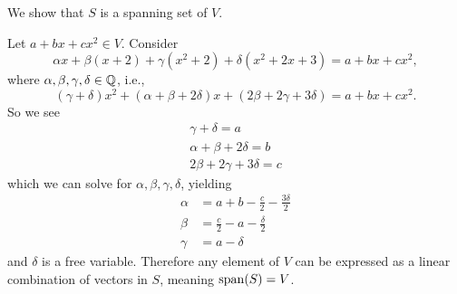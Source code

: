 \begin{questions}
    \item We show that $S$ is a spanning set of $V$.
    
    Let $a + bx + cx^2 \in V$. Consider
    \[
        \alpha x + \beta(x + 2) + \gamma(x^2 + 2) + \delta(x^2 + 2x + 3) = a + bx + cx^2,
    \]
    where $\alpha, \beta, \gamma, \delta \in \mathbb{Q}$, i.e.,
    \[
        (\gamma + \delta)x^2 + (\alpha + \beta + 2\delta)x + (2\beta + 2\gamma + 3\delta) = a + bx + cx^2.
    \]
    So we see
    \begin{align*}
        \gamma + \delta = a\\
        \alpha + \beta + 2\delta = b\\
        2\beta + 2\gamma + 3\delta = c
    \end{align*}
    which we can solve for $\alpha, \beta, \gamma, \delta$, yielding
    \begin{align*}
        \alpha &= a + b - \frac{c}{2} - \frac{3\delta}{2}\\
        \beta &= \frac{c}{2} - a - \frac{\delta}{2}\\
        \gamma &= a - \delta
    \end{align*}
    and $\delta$ is a free variable. Therefore any element of $V$ can be expressed as a linear combination of vectors in $S$, meaning $\mathrm{span}(S) = V$.
\end{questions}
